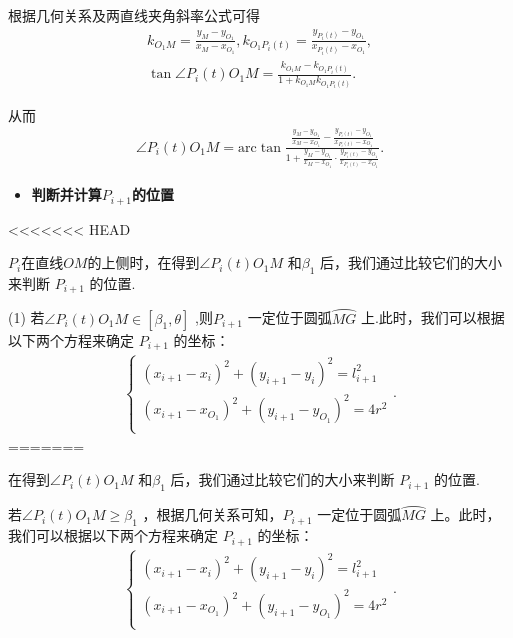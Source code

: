 \documentclass[../main.tex]{subfiles}
\begin{document}
根据几何关系及两直线夹角斜率公式可得
\begin{gather}\label{1.........444}
k_{O_1M}=\frac{y_M-y_{O_1}}{x_M-x_{O_1}},k_{O_1P_i\left( t \right)}=\frac{y_{P_i\left( t \right)}-y_{O_1}}{x_{P_i\left( t \right)}-x_{O_1}},
\\
\tan \angle P_i(t)O_1M=\frac{k_{O_1M}-k_{O_1P_i\left( t \right)}}{1+k_{O_1M}k_{O_1P_i\left( t \right)}}.
\end{gather}
\par 从而
\begin{align}\label{1.........445}
\angle P_i(t)O_1M= \mathrm{arc}\tan \frac{\frac{y_M-y_{O_1}}{x_M-x_{O_1}}-\frac{y_{P_i\left( t \right)}-y_{O_1}}{x_{P_i\left( t \right)}-x_{O_1}}}{1+\frac{y_M-y_{O_1}}{x_M-x_{O_1}}\cdot \frac{y_{P_i\left( t \right)}-y_{O_1}}{x_{P_i\left( t \right)}-x_{O_1}}}.
\end{align}
\begin{itemize}
\item \textbf{判断并计算$P_{i+1}$的位置}\label{subsubsection4.4.1.2}
\end{itemize}
<<<<<<< HEAD
    \par \(P_i\)在直线\(OM\)的上侧时，在得到\(\angle P_{i}(t)O_{1}M\) 和\(\beta_{1}\) 后，我们通过比较它们的大小来判断 \(P_{i + 1}\) 的位置.
    \par (1) 若$ \angle P_i(t)O_1M\in \left[ \beta _1,\theta \right]$ ,则\(P_{i + 1}\) 一定位于圆弧\(\wideparen{MG}\) 上.此时，我们可以根据以下两个方程来确定 \(P_{i + 1}\) 的坐标：
    \begin{align}\label{1.........446}
        \left\{ \begin{array}{c}
        \left( x_{i+1}-x_i \right) ^2+\left( y_{i+1}-y_i \right) ^2=l_{i+1}^{2}\\
        \left( x_{i+1}-x_{O_1} \right) ^2+\left( y_{i+1}-y_{O_1} \right) ^2=4r^2\\
        \end{array} \right. .
        \end{align}
=======
\par 在得到\(\angle P_{i}(t)O_{1}M\) 和\(\beta_{1}\) 后，我们通过比较它们的大小来判断 \(P_{i + 1}\) 的位置.
\par 若\(\angle P_{i}(t)O_{1}M \geq \beta_{1}\) ，根据几何关系可知，\(P_{i + 1}\) 一定位于圆弧\(\wideparen{MG}\) 上。此时，我们可以根据以下两个方程来确定 \(P_{i + 1}\) 的坐标：
\begin{align}\label{1.........446}
\left\{ \begin{array}{c}
\left( x_{i+1}-x_i \right) ^2+\left( y_{i+1}-y_i \right) ^2=l_{i+1}^{2}\\
\left( x_{i+1}-x_{O_1} \right) ^2+\left( y_{i+1}-y_{O_1} \right) ^2=4r^2\\
\end{array} \right. .
\end{align}
\end{document}
